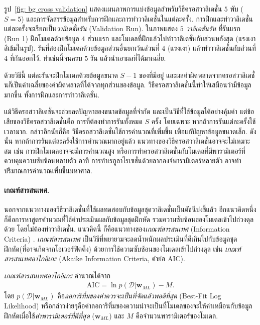 รูป~\ref{fig: bg cross validation} แสดงแผนภาพการแบ่งข้อมูลสำหรับวิธีครอสวาลิเดชั่น $5$ พับ ($S=5$) และการจัดสรรข้อมูลสำหรับการฝึกและการทำวาลิเดชั่นในแต่ละครั้ง. 
การฝึกและทำวาลิเดชั่นแต่ละครั้งจะเรียกเป็น\textit{วาลิเดชั่นรัน} (Validation Run).
ในภาพแสดง $5$ \textit{วาลิเดชั่นรัน} 
ที่รันแรก (Run 1) ฝึกโมเดลด้วยข้อมูล $4$ ส่วนแรก และโมเดลที่ฝึกแล้วไปทำวาลิเดชั่นกับส่วนหลังสุด (แรงเงาสีเข้มในรูป).
รันที่สองฝึกโมเดลด้วยข้อมูลส่วนอื่นยกเว้นส่วนที่ $4$ (แรงเงา) แล้วทำวาลิเดชั่นกับส่วนที่ $4$ ที่กันออกไว้.
ทำเช่นนี้จนครบ $5$ รัน แล้วนำเอาผลที่ได้มาเฉลี่ย.

ด้วยวิธีนี้ แต่ละรันจะฝึกโมเดลด้วยข้อมูลขนาด $S-1$ ของที่มีอยู่ 
และผลค่าผิดพลาดจากครอสวาลิเดชั่นก็เป็นค่าเฉลี่ยของค่าผิดพลาดที่ได้จากทุกส่วนของข้อมูล.
วิธีครอสวาลิเดชั่นนี้ทำให้เสมือนว่ามีข้อมูลมากขึ้น ทั้งการฝึกและการทำวาลิเดชั่น.

แม้วิธีครอสวาลิเดชั่นจะช่วยลดปัญหาของขนาดข้อมูลที่จำกัด และเป็นวิธีที่ใช้ข้อมูลได้อย่างคุ้มค่า
แต่ข้อเสียของวิธีครอสวาลิเดชั่นคือ การที่ต้องทำการรันทั้งหมด $S$ ครั้ง
โดยเฉพาะ หากถ้าการรันแต่ละครั้งใช้เวลามาก.
กล่าวอีกนัยก็คือ วิธีครอสวาลิเดชั่นใช้การคำนวณที่เพิ่มขึ้น เพื่อแก้ปัญหาข้อมูลขนาดเล็ก.
ดังนั้น หากถ้าการรันแต่ละครั้งใช้การคำนวณมากอยู่แล้ว แนวทางของวิธีครอสวาลิเดชั่นอาจจะไม่เหมาะสม
เช่น การฝึกโมเดลอาจจะมีการคำนวณสูง
หรือการทำครอสวาลิเดชั่นกับโมเดลที่มีพารามิเตอร์ที่ควบคุมความซับซ้อนหลายตัว
อาทิ การทำเรกูลาไรเซชั่นด้วยลากองจ์พารามิเตอร์หลายตัว อาจทำปริมาณการคำนวณเพิ่มขึ้นมหาศาล.

\paragraph{เกณฑ์สารสนเทศ.}

นอกจากแนวทางของวิธีวาลิเดชั่นที่ใช้ผลทดสอบกับข้อมูลชุดวาลิเดชั่นเป็นดัชนีบ่งชี้แล้ว
อีกแนวคิดหนึ่งก็คือการหาสูตรคำนวณที่ใช้ค่าประเมินผลกับข้อมูลชุดฝึกหัด รวมความซับซ้อนของโมเดลเข้าไปถ่วงดุลด้วย
โดยไม่ต้องทำวาลิเดชั่น.
แนวคิดนี้ ก็คือแนวทางของ\textit{เกณฑ์สารสนเทศ} (Information Criteria)  .
\textit{เกณฑ์สารสนเทศ} เป็นวิธีที่พยายามจะลดน้ำหนักผลประเมินที่ดีเกินไปกับข้อมูลชุดฝึกหัด(ที่อาจเกิดจากโอเวอร์ฟิตติ้ง)
ด้วยการใช้ความซับซ้อนของโมเดลเข้าไปถ่วงดุล เช่น \textit{เกณฑ์สารสนเทศอาไกอิเกะ}
(Akaike Information Criteria, คำย่อ AIC).

\textit{เกณฑ์สารสนเทศอาไกอิเกะ} คำนวณได้จาก
 
%
\begin{eqnarray}
   \mathrm{AIC} = \ln p(\mathcal{D}|\mathbf{w}_{ML}) - M
\label{eq: AIC}.
\end{eqnarray}
โดย $p(\mathcal{D}|\mathbf{w}_{ML})$ คือ\textit{ลอการิทึ่มของค่าควรจะเป็นที่จัดแล้วพอดีที่สุด} (Best-Fit Log Likelihood) หรือกล่าวง่ายๆคือค่าลอการิทึ่มของความน่าจะเป็นที่โมเดลของจะให้ค่าเหมือนกับข้อมูลฝึกหัดเมื่อใช้\textit{ค่าพารามิเตอร์ที่ดีที่สุด} ($\mathbf{w}_{ML}$) 
และ $M$ คือจำนวนพารามิเตอร์ของโมเดล.


